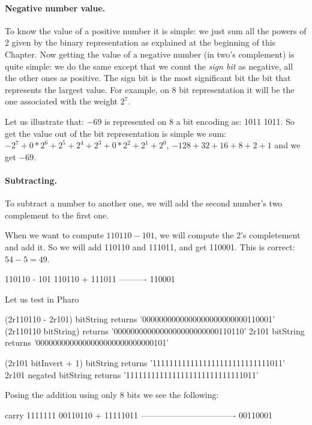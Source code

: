 \documentclass[a4paper,10pt,twoside]{book}
\begin{document}
\paragraph{Negative number value.}
To know the value of a positive number it is simple: we just sum all the powers of 2 given by the binary representation as explained at the beginning of this Chapter. Now getting the value of a negative number (in two's complement) is quite simple: we do the same except that we count the \emph{sign bit} as negative, all the other ones as positive. The sign bit is the most significant bit \ie the bit that represents the largest value. For example, on 8 bit representation it will be the one associated with the weight $2^{7}$.

Let us illustrate that: 
$-69$ is represented on 8 a bit encoding as: 1011 1011. So get the value out of the bit representation is simple we sum: $-2^7 + 0*2^6 + 2^5 + 2^4 + 2^3 + 0*2^2 + 2^1 + 2^0$, \ie $-128 + 32 + 16 + 8 + 2 + 1$ and we get $-69$. 


\paragraph{Subtracting.}
To subtract a number to another one, we will add the second number's two complement to the first one.

When we want to compute $110110 - 101$, we will compute the 2's completement and add it. 
So we will add 110110 and 111011, and get 110001. This is correct: $54 - 5 = 49$.


\begin{code}{}
110110 - 101
   110110
+ 111011
----------
   110001
\end{code}

Let us test in Pharo
\begin{code}{}
(2r110110 - 2r101) bitString	
	returns '0000000000000000000000000110001'
(2r110110 bitString) 	
	returns '0000000000000000000000000110110'
2r101 bitString
	returns '0000000000000000000000000000101'		
							
(2r101 bitInvert + 1) bitString
	returns '1111111111111111111111111111011'	
2r101 negated bitString
	returns '1111111111111111111111111111011'	
\end{code}
	
Posing the addition using only 8 bits we see the following:

\begin{code}{}
carry	1111111 
		 00110110
+		11111011	
	----------------------------------
		 00110001	
\end{code}
\end{document}
